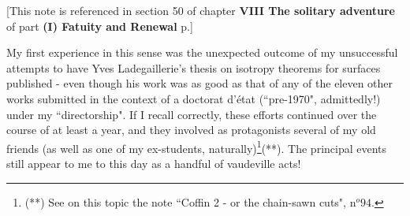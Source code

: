 \label{note:50} [This note is referenced in section 50 of chapter \textbf{VIII The solitary adventure} of part \textbf{(I) Fatuity and Renewal} p.]

My first experience in this sense was the unexpected outcome of my unsuccessful attempts to have Yves Ladegaillerie's thesis on isotropy theorems for surfaces published - even though his work was as good as that of any of the eleven other works submitted in the context of a doctorat d'\'etat (``pre-1970", admittedly!) under my ``directorship". If I recall correctly, these efforts continued over the course of at least a year, and they involved as protagonists several of my old friends (as well as one of my ex-students, naturally)\footnote{(**) See on this topic the note ``Coffin 2 - or the chain-sawn cuts", n$^o 94$.}(**). 
The principal events still appear to me to this day as a handful of vaudeville acts!

